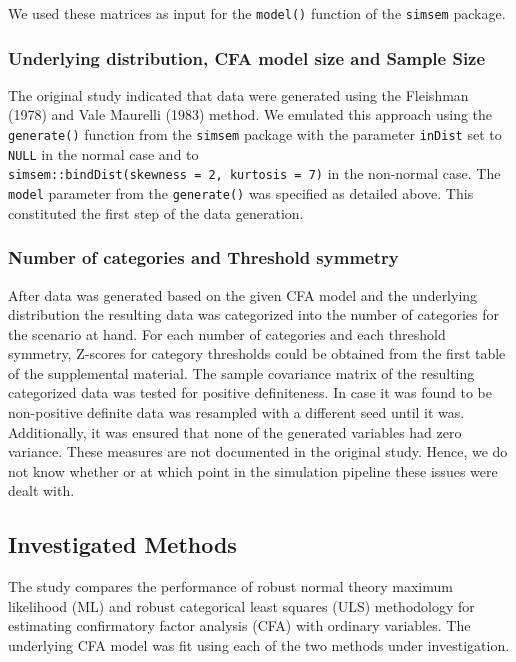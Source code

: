 \documentclass[10,a4paperpaper,]{article}
\begin{document}
We used these matrices as input for the \texttt{model()} function of the
\texttt{simsem} package.

\subsubsection{Underlying distribution, CFA model size and Sample Size}

The original study indicated that data were generated using the
Fleishman (1978) and Vale Maurelli (1983) method. We emulated this
approach using the \texttt{generate()} function from the \texttt{simsem}
package with the parameter \texttt{inDist} set to \texttt{NULL} in the
normal case and to
\texttt{simsem::bindDist(skewness\ =\ 2,\ kurtosis\ =\ 7)} in the
non-normal case. The \texttt{model} parameter from the
\texttt{generate()} was specified as detailed above. This constituted
the first step of the data generation.

\subsubsection{Number of categories and Threshold symmetry}

After data was generated based on the given CFA model and the underlying
distribution the resulting data was categorized into the number of
categories for the scenario at hand. For each number of categories and
each threshold symmetry, Z-scores for category thresholds could be
obtained from the first table of the supplemental material. The sample
covariance matrix of the resulting categorized data was tested for
positive definiteness. In case it was found to be non-positive definite
data was resampled with a different seed until it was. Additionally, it
was ensured that none of the generated variables had zero variance.
These measures are not documented in the original study. Hence, we do
not know whether or at which point in the simulation pipeline these
issues were dealt with.

\FloatBarrier 

\subsection{Investigated Methods}

The study compares the performance of robust normal theory maximum
likelihood (ML) and robust categorical least squares (ULS) methodology
for estimating confirmatory factor analysis (CFA) with ordinary
variables. The underlying CFA model was fit using each of the two
methods under investigation.
\end{document}
